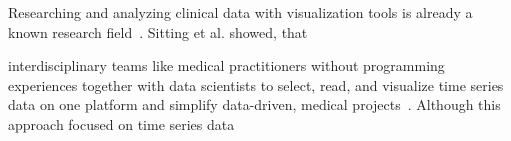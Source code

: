 Researching and analyzing clinical data with visualization tools is already a known research field~\cite{Caban.2015, Sittig.2015, UnberathPhilipp.2019, Festag.2019}. Sitting et al. showed, that

interdisciplinary teams like medical practitioners without programming experiences together with data scientists to select, read, and visualize time series data on one platform and simplify data-driven, medical projects~\cite{Festag.2019}. Although this approach focused on time series data    